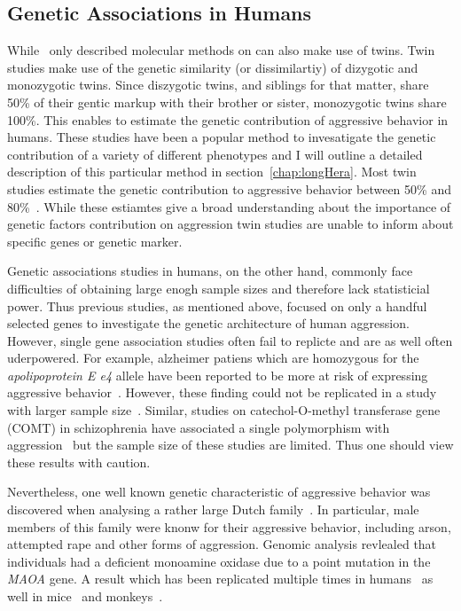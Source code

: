 \subsection{Genetic Associations in Humans}
\label{sub:genetic_associations_in_humans}
While~\citet{Maxson2005} only described molecular methods on can also make use of twins.
Twin studies make use of the genetic similarity (or dissimilartiy) of dizygotic and monozygotic twins.
Since diszygotic twins, and siblings for that matter, share 50\% of their gentic markup with their brother or sister, monozygotic twins share 100\%.
This enables to estimate the genetic contribution of aggressive behavior in humans.
These studies have been a popular method to invesatigate the genetic contribution of a variety of different phenotypes and I will outline a detailed description of this particular method in section~\ref{chap:longHera}.
Most twin studies estimate the genetic contribution to aggressive behavior between 50\% and 80\%~\cite{Porsch2016}.
While these estiamtes give a broad understanding about the importance of genetic factors contribution on aggression twin studies are unable to inform about specific genes or genetic marker.

Genetic associations studies in humans, on the other hand, commonly face difficulties of obtaining large enogh sample sizes and therefore lack statisticial power.
Thus previous studies, as mentioned above, focused on only a handful selected genes to investigate the genetic architecture of human aggression.
However, single gene association studies often fail to replicte and are as well often uderpowered.
For example, alzheimer patiens which are homozygous for the \textit{apolipoprotein E e4} allele have been reported to be more at risk of expressing aggressive behavior~\cite{Craig2004a,VanDerFlier2006}.
However, these finding could not be replicated in a study with larger sample size~\cite{Hollingworth2006}.
Similar, studies on catechol-O-methyl transferase gene (COMT) in schizophrenia have associated a single polymorphism with aggression~\cite{Hirata2013,Calati2011} but the sample size of these studies are limited.
Thus one should view these results with caution.

Nevertheless, one well known genetic characteristic of aggressive behavior was discovered when analysing a rather large Dutch family~\cite{Brunner1993}.
In particular, male members of this family were knonw for their aggressive behavior, including arson, attempted rape and other forms of aggression.
Genomic analysis revlealed that individuals had a deficient monoamine oxidase due to a point mutation in the \textit{MAOA} gene.
A result which has been replicated multiple times in humans~\cite{Huang2004,Manuck2000} as well in mice~\cite{Cases1995b} and monkeys~\cite{Newman2005}.

